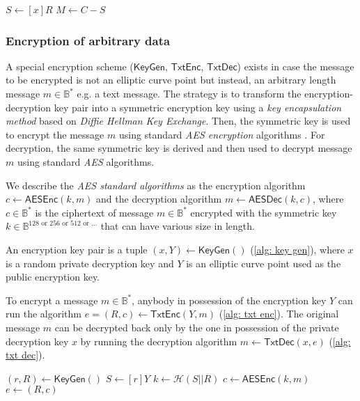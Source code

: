 \begin{algorithm}[ht]
    \DontPrintSemicolon
    \caption{$\mathsf{Dec} (x, e)$}
    \label{alg: dec}
    
    $S \gets [x]R$ \;
    $M \gets C - S$ \;
     
\end{algorithm}


\subsubsection{Encryption of arbitrary data} \label{app: encryption of arbitrary data}
A special encryption scheme ($\mathsf{KeyGen}$, $\mathsf{TxtEnc}$, $\mathsf{TxtDec}$) exists in case the message to be encrypted is not an elliptic curve point but instead, an arbitrary length message $m \in \mathbb{B}^*$ e.g. a text message. The strategy is to transform the encryption-decryption key pair into a symmetric encryption key using a \textit{key encapsulation method} based on \textit{Diffie Hellman Key Exchange}. Then, the symmetric key is used to encrypt the message $m$ using standard \textit{AES encryption} algorithms \cite{NIST01}. For decryption, the same symmetric key is derived and then used to decrypt message $m$ using standard \textit{AES} algorithms.

We describe the \textit{AES standard algorithms} as the encryption algorithm $c \gets \mathsf{AESEnc} (k, m)$ and the decryption algorithm $m \gets \mathsf{AESDec} (k, c)$, where $c \in \mathbb{B}^*$ is the ciphertext of message $m \in \mathbb{B}^*$ encrypted with the symmetric key $k \in \mathbb{B}^{128 \text{ or } 256 \text{ or } 512 \text{ or ...}}$ that can have various size in length.

An encryption key pair is a tuple $(x, Y) \gets \mathsf{KeyGen}()$ (\cref{alg: key gen}), where $x$ is a random private decryption key and $Y$ is an elliptic curve point used as the public encryption key.

To encrypt a message $m \in \mathbb{B}^*$, anybody in possession of the encryption key $Y$ can run the algorithm $e = (R, c) \gets \mathsf{TxtEnc} (Y, m)$ (\cref{alg: txt enc}). The original message $m$ can be decrypted back only by the one in possession of the private decryption key $x$ by running the decryption algorithm $m \gets \mathsf{TxtDec} (x, e)$ (\cref{alg: txt dec}).

\begin{algorithm}[ht]
    \DontPrintSemicolon
    \caption{$\mathsf{TxtEnc} (Y, m)$}
    \label{alg: txt enc}
    
    $(r, R) \gets \mathsf{KeyGen}()$ 
    $S \gets [r]Y$ \;
    $k \gets \mathcal{H} (S || R)$ \;
    $c \gets \mathsf{AESEnc} (k, m)$ \;
    $e \gets (R, c)$ \;
     
\end{algorithm}

